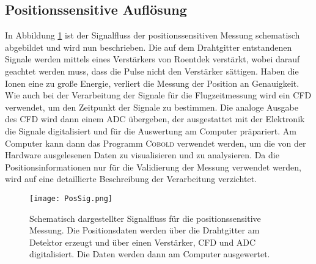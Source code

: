\subsection{Positionssensitive Auflösung}
In Abbildung \ref{fig:pos} ist der Signalfluss der positionssensitiven Messung schematisch abgebildet und wird nun beschrieben. Die auf dem Drahtgitter entstandenen Signale werden mittels eines Verstärkers von Roentdek verstärkt, wobei darauf geachtet werden muss, dass die Pulse nicht den Verstärker sättigen. Haben die Ionen eine zu große Energie, verliert die Messung der Position an Genauigkeit. Wie auch bei der Verarbeitung der Signale für die Flugzeitmessung wird ein CFD verwendet, um den Zeitpunkt der Signale zu bestimmen. Die analoge Ausgabe des CFD wird dann einem ADC übergeben, der ausgestattet mit der Elektronik die Signale digitalisiert und für die Auswertung am Computer präpariert. Am Computer kann dann das Programm \textsc{Cobold} verwendet werden, um die von der Hardware ausgelesenen Daten zu visualisieren und zu analysieren. Da die Positionsinformationen nur für die Validierung der Messung verwendet werden, wird auf eine detaillierte Beschreibung der Verarbeitung verzichtet.

\begin{figure}
    \centering
    \texttt{[image: PosSig.png]}
    \caption[Signalfluss für die positionssensitive Messung]{Schematisch dargestellter Signalfluss für die positionssensitive Messung. Die Positionsdaten werden über die Drahtgitter am Detektor erzeugt und über einen Verstärker, CFD und ADC digitalisiert. Die Daten werden dann am Computer ausgewertet.}
    \label{fig:pos} 
\end{figure}